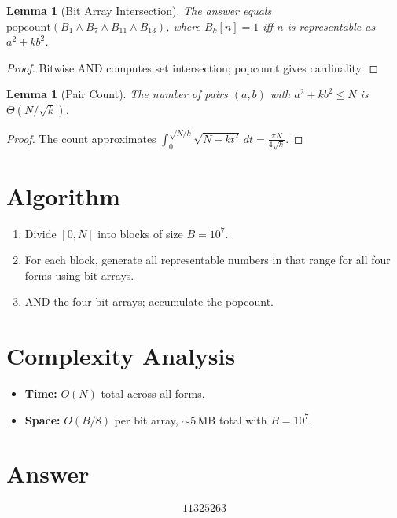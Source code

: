 \documentclass[12pt]{article}
\newtheorem{lemma}[theorem]{Lemma}
\begin{document}
\begin{lemma}[Bit Array Intersection]
The answer equals $\mathrm{popcount}(B_1 \wedge B_7 \wedge B_{11} \wedge B_{13})$, where $B_k[n] = 1$ iff $n$ is representable as $a^2 + kb^2$.
\end{lemma}
\begin{proof}
Bitwise AND computes set intersection; popcount gives cardinality.
\end{proof}

\begin{lemma}[Pair Count]
The number of pairs $(a,b)$ with $a^2 + kb^2 \leq N$ is $\Theta(N/\sqrt{k})$.
\end{lemma}
\begin{proof}
The count approximates $\int_0^{\sqrt{N/k}} \sqrt{N - kt^2}\,dt = \frac{\pi N}{4\sqrt{k}}$.
\end{proof}

\section{Algorithm}
\begin{enumerate}
\item Divide $[0, N]$ into blocks of size $B = 10^7$.
\item For each block, generate all representable numbers in that range for all four forms using bit arrays.
\item AND the four bit arrays; accumulate the popcount.
\end{enumerate}

\section{Complexity Analysis}
\begin{itemize}
\item \textbf{Time:} $O(N)$ total across all forms.
\item \textbf{Space:} $O(B/8)$ per bit array, $\sim 5$\,MB total with $B = 10^7$.
\end{itemize}

\section{Answer}

\[
\boxed{11325263}
\]
\end{document}
